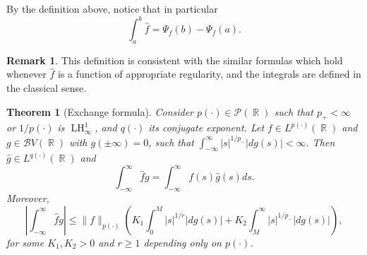 \documentclass[11pt,reqno]{amsart}
\newtheorem{theorem}{Theorem}[section]
\theoremstyle{definition}
\theoremstyle{definition}
\newtheorem{obs}{Remark}
\theoremstyle{definition}
\DeclareMathOperator{\R}{\mathbb{R}}
\newcommand{\p}{p(\cdot)}
\newcommand{\q}{q(\cdot)}
\newcommand{\Lp}{L^{\p}(\R)}
\newcommand{\BV}{\mathcal{B}V}
\newcommand{\LH}{\operatorname{LH}_\infty^1}
\begin{document}
By the definition above, notice that in particular 
        \begin{equation*}
            \int_a^b\widehat{f}=\Psi_f(b)-\Psi_f(a).
        \end{equation*}
\begin{obs}
    This definition is consistent with the similar formulas which hold whenever $\widehat{f}$ is a function of appropriate regularity, and the integrals are defined in the classical sense.
\end{obs}

\begin{theorem}[Exchange formula]\label{theo_exchange}
     Consider $\p\in\mathcal{P}(\R)$ such that $p_{+}<\infty$ or $1/\p$ is $\LH$, and $\q$ its conjugate exponent. Let $f\in \Lp$ and $g\in \BV(\R)$ with $g(\pm\infty)=0$, such that $\int_{-\infty}^{\infty}|s|^{1/p_{-}}|dg(s)|<\infty$. Then $\widehat{g}\in L^{\q}(\R)$ and 
    \begin{equation*}
        \int_{-\infty}^\infty\widehat{f}g=\int_{-\infty}^\infty f(s)\widehat{g}(s)ds.
    \end{equation*}
    Moreover, 
    \begin{equation}\label{inequality_statement_exchange}
        \left|\int_{-\infty}^\infty\widehat{f}g\right|\leq\|f\|_{\p}\left(K_1\int_0^M|s|^{1/r}|dg(s)|+K_2\int_{M}^{\infty}|s|^{1/p_{-}}|dg(s)|\right),
    \end{equation}
    for some $K_1,K_2>0$ and $r\geq 1$ depending only on $\p$.
\end{theorem}
\end{document}
